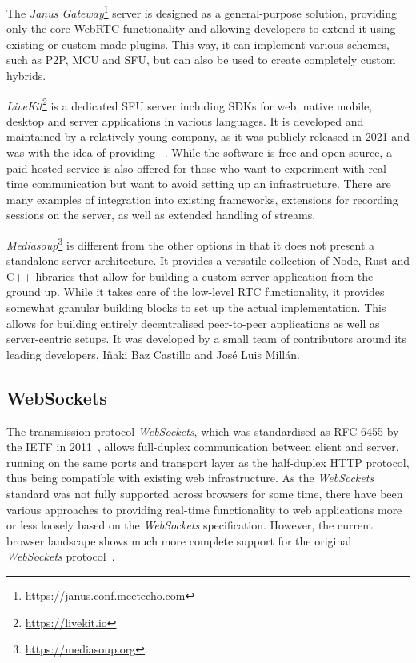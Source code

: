 The \emph{Janus Gateway}\footnote{\url{https://janus.conf.meetecho.com}} server is designed as a general-purpose solution, providing only the core \ac{WebRTC} functionality and allowing developers to extend it using existing or custom-made plugins.
This way, it can implement various schemes, such as \ac{P2P}, \ac{MCU} and \ac{SFU}, but can also be used to create completely custom hybrids.

\emph{LiveKit}\footnote{\url{https://livekit.io}} is a dedicated \ac{SFU} server including \ac{SDK}s for web, native mobile, desktop and server applications in various languages.
It is developed and maintained by a relatively young company, as it was publicly released in 2021 and was  with the idea of providing ~\parencite{livekitAbout}.
While the software is free and open-source, a paid hosted service is also offered for those who want to experiment with real-time communication but want to avoid setting up an infrastructure.
There are many examples of integration into existing frameworks, extensions for recording sessions on the server, as well as extended handling of streams.

\emph{Mediasoup}\footnote{\url{https://mediasoup.org}} is different from the other options in that it does not present a standalone server architecture.
It provides a versatile collection of Node, Rust and C++ libraries that allow for building a custom server application from the ground up.
While it takes care of the low-level \ac{RTC} functionality, it provides somewhat granular building blocks to set up the actual implementation.
This allows for building entirely decentralised peer-to-peer applications as well as server-centric setups.
It was developed by a small team of contributors around its leading developers, Iñaki Baz Castillo and José Luis Millán.

\subsection{WebSockets}
\label{subsec:websockets}

The transmission protocol \emph{WebSockets}, which was standardised as \ac{RFC} 6455 by the \ac{IETF} in 2011~\parencite{webSocketsProtocolRfc}, allows full-duplex communication between client and server, running on the same ports and transport layer as the half-duplex \ac{HTTP} protocol, thus being compatible with existing web infrastructure.
As the \emph{WebSockets} standard was not fully supported across browsers for some time, there have been various approaches to providing real-time functionality to web applications more or less loosely based on the \emph{WebSockets} specification.
However, the current browser landscape shows much more complete support for the original \emph{WebSockets} protocol~\parencite{canIUseWebSockets}.

